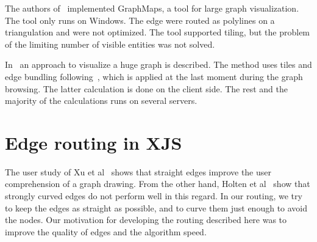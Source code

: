 \documentclass{gd-llncs}
\begin{document}
The authors of~\cite{nachmanson2015graphmaps} implemented GraphMaps, a tool for large graph visualization.
The tool only runs on Windows. The edge were routed as polylines on a triangulation and were not optimized.
The tool supported tiling, but the problem of the limiting number of visible entities was not solved.

In~\cite{perrot2018cornac} an approach to visualize a huge graph is described. The method uses tiles and
edge bundling following~\cite{hurter2012graph}, which is applied at the last moment during the graph browsing.
The latter calculation is done on the client side. The rest and the majority of the calculations runs on several servers.




\section*{Edge routing in XJS}
The user study of Xu et al~\cite{xu2012user} shows that straight edges improve the user comprehension of a graph drawing.
From the other hand, Holten et al~\cite{holten2009user} show that strongly curved edges do not perform well in this regard.
In our routing, we try to keep the edges as straight as possible, and to curve them just enough to avoid the nodes.
Our motivation for developing the routing described here was to improve the quality of edges and the algorithm speed.
\end{document}
